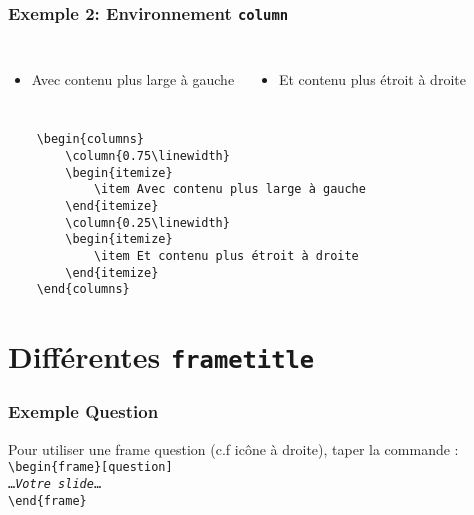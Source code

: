 \documentclass[aspectratio=169]{beamer}
\begin{document}
\begin{frame}[fragile]
    \frametitle{Exemple 2: Environnement \texttt{column}}
    \begin{columns}
        \begin{itemize}
            \item Avec contenu plus large à gauche
        \end{itemize}
        \begin{itemize}
            \item Et contenu plus étroit à droite 
        \end{itemize}
    \end{columns}
{\scriptsize
\begin{verbatim}
    \begin{columns}
        \column{0.75\linewidth}
        \begin{itemize}
            \item Avec contenu plus large à gauche
        \end{itemize}
        \column{0.25\linewidth}
        \begin{itemize}
            \item Et contenu plus étroit à droite 
        \end{itemize}
    \end{columns}
\end{verbatim}
}
\end{frame}

\section{Différentes \texttt{frametitle}}
\begin{frame}[question]
    \frametitle{Exemple \og Question\fg}

Pour utiliser une frame question (c.f icône à droite), taper la commande :
\noindent\texttt{%
\textbackslash begin\{frame\}[question]\\
\ldots\emph{Votre slide}\ldots\\
\textbackslash end\{frame\}
}
\end{frame}
\end{document}
